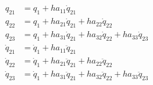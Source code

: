 \documentclass[10pt,letter]{book}
\begin{document}
     \begin{equation}\nonumber
       \begin{split}
         q_{21} &= q_1 + h a_{11} \dot{q}_{21} \\
         q_{22} &= q_1 + h a_{21} \dot{q}_{21} + h a_{22} \dot{q}_{22} \\
         q_{23} &= q_1 + h a_{31} \dot{q}_{21} + h a_{32} \dot{q}_{22} + h a_{33} \dot{q}_{23} \\\hline
         \dot{q}_{21} &= \dot{q}_1 + h a_{11} \ddot{q}_{21} \\
         \dot{q}_{22} &= \dot{q}_1 + h a_{21} \ddot{q}_{21} + h a_{22} \ddot{q}_{22} \\
         \dot{q}_{23} &= \dot{q}_1 + h a_{31} \ddot{q}_{21} + h a_{32} \ddot{q}_{22} + h a_{33} \ddot{q}_{23} \\
       \end{split}
     \end{equation}
     
\end{document}
